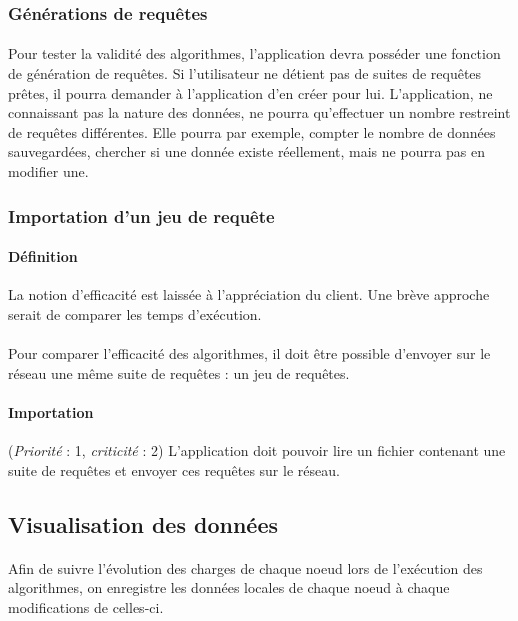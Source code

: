 \documentclass[12pt]{article}
\newcommand{\besoin}[2] {
  (\textit{Priorité} : #1, \textit{criticité} : #2)
}
\begin{document}
\subsubsection{Générations de requêtes}

\paragraph{} Pour tester la validité des algorithmes, l'application devra posséder une fonction de génération de requêtes. 
Si l'utilisateur ne détient pas de suites de requêtes prêtes, il pourra demander à l'application d'en créer pour lui. 
L'application, ne connaissant pas la nature des données, ne pourra qu'effectuer un nombre restreint de requêtes différentes. 
Elle pourra par exemple, compter le nombre de données sauvegardées, chercher si une donnée existe réellement, mais ne pourra pas en modifier une.


\subsubsection{Importation d'un jeu de requête}

\paragraph{Définition} La notion d'efficacité est laissée à l'appréciation du client. Une brève approche serait de comparer les temps d'exécution.

\paragraph{} Pour comparer l'efficacité des algorithmes, il doit être possible d'envoyer sur le réseau une même suite de requêtes : un jeu de requêtes.

\paragraph{Importation} \besoin{1}{2} L'application doit pouvoir lire un fichier contenant une suite de requêtes et envoyer ces requêtes sur le réseau.


\subsection{Visualisation des données}

\paragraph{} Afin de suivre l'évolution des charges de chaque noeud lors de l'exécution des algorithmes, on enregistre les données locales de chaque noeud à chaque modifications de celles-ci.
\end{document}
